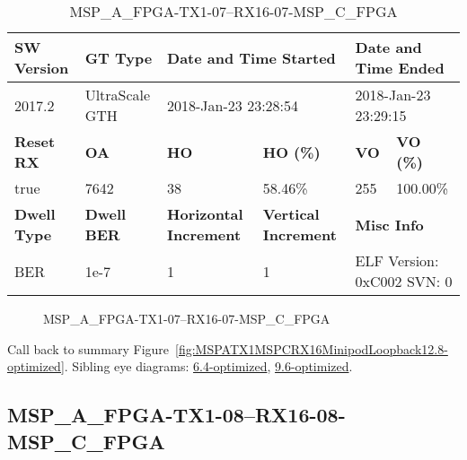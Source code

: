 \begin{table}[h]
\centering
\caption{MSP\_A\_FPGA-TX1-07--RX16-07-MSP\_C\_FPGA}
\label{tab:MSPAFPGATX107RX1607MSPCFPGA12.8-optimized}
\begin{tabular}{@{}|l|l|l|l|l|l|@{}}
\toprule
\textbf{SW Version}                & \textbf{GT Type}   & \multicolumn{2}{l|}{\textbf{Date and Time Started}}            & \multicolumn{2}{l|}{\textbf{Date and Time Ended}}        \\ \midrule
2017.2                       & UltraScale GTH          & \multicolumn{2}{l|}{2018-Jan-23 23:28:54}                   & \multicolumn{2}{l|}{2018-Jan-23 23:29:15}               \\ \midrule
\textbf{Reset RX}                  & \textbf{OA} & \textbf{HO}   & \textbf{HO (\%)} & \textbf{VO} & \textbf{VO (\%)} \\ \midrule
true & 7642        & 38          & 58.46\%        & 255        & 100.00\%       \\ \midrule
\textbf{Dwell Type}                & \textbf{Dwell BER} & \textbf{Horizontal Increment} & \textbf{Vertical Increment}    & \multicolumn{2}{l|}{\textbf{Misc Info}}                  \\ \midrule
BER                            & 1e-7        & 1        & 1           & \multicolumn{2}{l|}{ELF Version: 0xC002 SVN: 0}                         \\ \bottomrule
\end{tabular}
\end{table}

\begin{figure}[h]
\caption{MSP\_A\_FPGA-TX1-07--RX16-07-MSP\_C\_FPGA} \label{fig:MSPAFPGATX107RX1607MSPCFPGA12.8-optimized}
\end{figure}

Call back to summary Figure~\ref{fig:MSPATX1MSPCRX16MinipodLoopback12.8-optimized}.
Sibling eye diagrams: \hyperref[sec:MSPAFPGATX107RX1607MSPCFPGA6.4-optimized]{6.4-optimized}, \hyperref[sec:MSPAFPGATX107RX1607MSPCFPGA9.6-optimized]{9.6-optimized}.

\clearpage
\newpage


\subsection{MSP\_A\_FPGA-TX1-08--RX16-08-MSP\_C\_FPGA}\label{sec:MSPAFPGATX108RX1608MSPCFPGA12.8-optimized}

